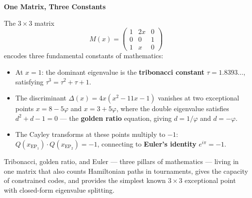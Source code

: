 \documentclass[12pt]{article}
\begin{document}
\begin{center}
{\Large\bfseries One Matrix, Three Constants}
\end{center}

\medskip

The $3 \times 3$ matrix
\[
M(x) = \begin{pmatrix} 1 & 2x & 0 \\ 0 & 0 & 1 \\ 1 & x & 0 \end{pmatrix}
\]
encodes three fundamental constants of mathematics:

\begin{itemize}
\item At $x = 1$: the dominant eigenvalue is the \textbf{tribonacci constant} $\tau = 1.8393\ldots$, satisfying $\tau^3 = \tau^2 + \tau + 1$.

\item The discriminant $\Delta(x) = 4x(x^2 - 11x - 1)$ vanishes at two exceptional points $x = 8 - 5\varphi$ and $x = 3 + 5\varphi$, where the double eigenvalue satisfies $d^2 + d - 1 = 0$ --- the \textbf{golden ratio} equation, giving $d = 1/\varphi$ and $d = -\varphi$.

\item The Cayley transforms at these points multiply to $-1$: $Q(x_{\mathrm{EP}_1}) \cdot Q(x_{\mathrm{EP}_2}) = -1$, connecting to \textbf{Euler's identity} $e^{i\pi} = -1$.
\end{itemize}

Tribonacci, golden ratio, and Euler --- three pillars of mathematics --- living in one matrix that also counts Hamiltonian paths in tournaments, gives the capacity of constrained codes, and provides the simplest known $3 \times 3$ exceptional point with closed-form eigenvalue splitting.
\end{document}

